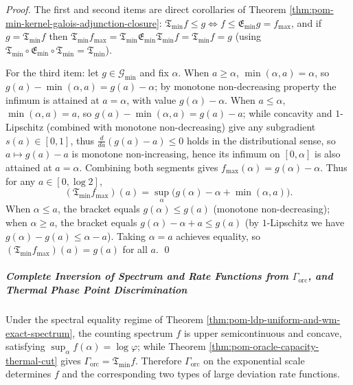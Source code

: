 \begin{proof}
The first and second items are direct corollaries of Theorem \ref{thm:pom-min-kernel-galois-adjunction-closure}:
\(\mathfrak{T}_{\min}f\le g\Longleftrightarrow f\le \mathfrak{E}_{\min}g=f_{\max}\), and if \(g=\mathfrak{T}_{\min}f\) then
\(
\mathfrak{T}_{\min}f_{\max}
=\mathfrak{T}_{\min}\mathfrak{E}_{\min}\mathfrak{T}_{\min}f
=\mathfrak{T}_{\min}f=g
\)
(using \(\mathfrak{T}_{\min}\circ\mathfrak{E}_{\min}\circ\mathfrak{T}_{\min}=\mathfrak{T}_{\min}\)).
\par
For the third item: let \(g\in\mathcal{G}_{\min}\) and fix \(\alpha\).
When \(a\ge \alpha\), \(\min(\alpha,a)=\alpha\), so \(g(a)-\min(\alpha,a)=g(a)-\alpha\);
by monotone non-decreasing property the infimum is attained at \(a=\alpha\), with value \(g(\alpha)-\alpha\).
When \(a\le \alpha\), \(\min(\alpha,a)=a\), so \(g(a)-\min(\alpha,a)=g(a)-a\);
while concavity and \(1\)-Lipschitz (combined with monotone non-decreasing) give any subgradient \(s(a)\in[0,1]\), thus
\(
\frac{d}{da}(g(a)-a)\le 0
\)
holds in the distributional sense, so \(a\mapsto g(a)-a\) is monotone non-increasing, hence its infimum on \([0,\alpha]\) is also attained at \(a=\alpha\).
Combining both segments gives \(f_{\max}(\alpha)=g(\alpha)-\alpha\).
Thus for any \(a\in[0,\log 2]\),
\[
(\mathfrak{T}_{\min}f_{\max})(a)
=\sup_{\alpha}\bigl(g(\alpha)-\alpha+\min(\alpha,a)\bigr).
\]
When \(\alpha\le a\), the bracket equals \(g(\alpha)\le g(a)\) (monotone non-decreasing);
when \(\alpha\ge a\), the bracket equals \(g(\alpha)-\alpha+a\le g(a)\) (by \(1\)-Lipschitz we have \(g(\alpha)-g(a)\le \alpha-a\)).
Taking \(\alpha=a\) achieves equality, so \((\mathfrak{T}_{\min}f_{\max})(a)=g(a)\) for all \(a\). \qed
\end{proof}

\subparagraph{Complete Inversion of Spectrum and Rate Functions from \texorpdfstring{$\Gamma_{\mathrm{orc}}$}{Gamma\_orc}, and Thermal Phase Point Discrimination}
Under the spectral equality regime of Theorem \ref{thm:pom-ldp-uniform-and-wm-exact-spectrum}, the counting spectrum \(f\) is upper semicontinuous and concave, satisfying
\(
\sup_\alpha f(\alpha)=\log\varphi
\);
while Theorem \ref{thm:pom-oracle-capacity-thermal-cut} gives
\(
\Gamma_{\mathrm{orc}}=\mathfrak{T}_{\min}f
\).
Therefore \(\Gamma_{\mathrm{orc}}\) on the exponential scale determines \(f\) and the corresponding two types of large deviation rate functions.

